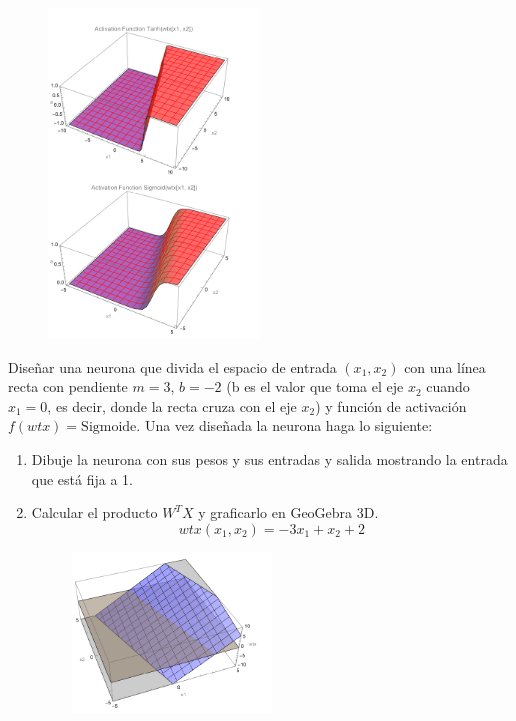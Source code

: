 \documentclass{article}
\begin{document}
\begin{flushleft}
\begin{enumerate}
\begin{figure}[H]
  \includegraphics[width=0.5\textwidth]{1d.png}  %
\end{figure}
\end{enumerate}
Diseñar una neurona que divida el espacio de entrada $(x_1, x_2)$ con una línea recta con pendiente
$m=3$, $b=-2$ (b es el valor que toma el eje $x_2$ cuando $x_1=0$, es decir, donde la recta cruza con el eje
$x_2$) y función de activación $f(wtx)=\text{Sigmoide}$. Una vez diseñada la neurona haga lo siguiente:
\begin{enumerate}
  \item Dibuje la neurona con sus pesos y sus entradas y salida mostrando la entrada que está fija a 1.
  \item Calcular el producto $W^T X$ y graficarlo en GeoGebra 3D.
  \[ wtx(x_1, x_2) = -3 x_1 + x_2 + 2 \]
  \begin{figure}[H]
    \centering
    \includegraphics[width=0.5\textwidth]{Imagen0.png}  %
  \end{figure}

\end{enumerate}
\end{flushleft}
\end{document}
